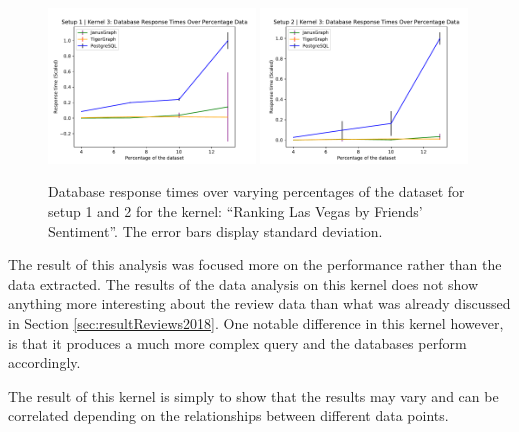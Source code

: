 \begin{figure}[h]
    \centering
    \includegraphics[width=0.49\textwidth]{img/perfResults/cityPlotSetup1.pdf}
    \includegraphics[width=0.49\textwidth]{img/perfResults/cityPlotSetup2.pdf}
    \caption{Database response times over varying percentages of the dataset for setup 1 and 2 for the kernel: ``Ranking Las Vegas by Friends' Sentiment''. The error bars display standard deviation.}
    \label{fig:cityPerfResults}
\end{figure}


The result of this analysis was focused more on the performance rather than the data extracted. The results of the data analysis on this kernel does not show anything more interesting about the review data than what was already discussed in Section \ref{sec:resultReviews2018}. One notable difference in this kernel however, is that it produces a much more complex query and the databases perform accordingly.

The result of this kernel is simply to show that the results may vary and can be correlated depending on the relationships between different data points.

